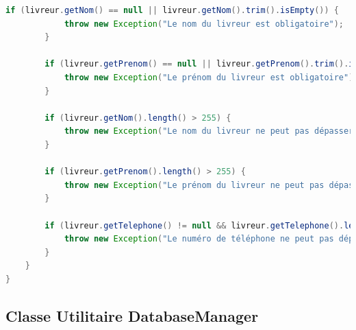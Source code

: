 \documentclass{rapportENSIAS}
\begin{document}
\begin{lstlisting}[language=Java, caption=Impl\'{e}mentation LivreurServiceImpl compl\`{e}te]
        if (livreur.getNom() == null || livreur.getNom().trim().isEmpty()) {
            throw new Exception("Le nom du livreur est obligatoire");
        }
        
        if (livreur.getPrenom() == null || livreur.getPrenom().trim().isEmpty()) {
            throw new Exception("Le prénom du livreur est obligatoire");
        }
        
        if (livreur.getNom().length() > 255) {
            throw new Exception("Le nom du livreur ne peut pas dépasser 255 caractères");
        }
        
        if (livreur.getPrenom().length() > 255) {
            throw new Exception("Le prénom du livreur ne peut pas dépasser 255 caractères");
        }
        
        if (livreur.getTelephone() != null && livreur.getTelephone().length() > 20) {
            throw new Exception("Le numéro de téléphone ne peut pas dépasser 20 caractères");
        }
    }
}
\end{lstlisting}

\subsection{Classe Utilitaire DatabaseManager}
\end{document}
